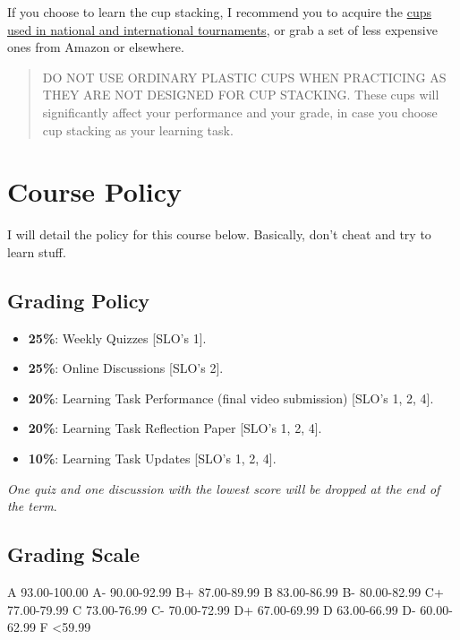 \documentclass[11pt,]{article}
\begin{document}
If you choose to learn the cup stacking, I recommend you to acquire the
\href{http://goo.gl/Y8HXt5}{cups used in national and international
tournaments}, or grab a set of less expensive ones from Amazon or
elsewhere.

\begin{quote}
DO NOT USE ORDINARY PLASTIC CUPS WHEN PRACTICING AS THEY ARE NOT
DESIGNED FOR CUP STACKING. These cups will significantly affect your
performance and your grade, in case you choose cup stacking as your
learning task.
\end{quote}

\hypertarget{course-policy}{%
\section{Course Policy}\label{course-policy}}

I will detail the policy for this course below. Basically, don't cheat
and try to learn stuff.

\hypertarget{grading-policy}{%
\subsection{Grading Policy}\label{grading-policy}}

\begin{itemize}
\item
  \textbf{25\%}: Weekly Quizzes {[}SLO's 1{]}.
\item
  \textbf{25\%}: Online Discussions {[}SLO's 2{]}.
\item
  \textbf{20\%}: Learning Task Performance (final video submission)
  {[}SLO's 1, 2, 4{]}.
\item
  \textbf{20\%}: Learning Task Reflection Paper {[}SLO's 1, 2, 4{]}.
\item
  \textbf{10\%}: Learning Task Updates {[}SLO's 1, 2, 4{]}.
\end{itemize}

\emph{One quiz and one discussion with the lowest score will be dropped
at the end of the term}.

\hypertarget{grading-scale}{%
\subsection{Grading Scale}\label{grading-scale}}

A 93.00-100.00 \textbar{} A- 90.00-92.99 B+ 87.00-89.99 \textbar{} B
83.00-86.99 \textbar{} B- 80.00-82.99 C+ 77.00-79.99 \textbar{} C
73.00-76.99 \textbar{} C- 70.00-72.99 D+ 67.00-69.99 \textbar{} D
63.00-66.99 \textbar{} D- 60.00-62.99 F \textless59.99
\end{document}

